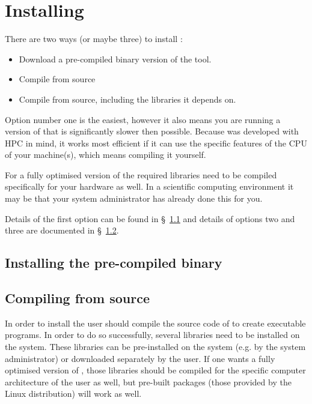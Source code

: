 \chapter{Installing \oanomm}

There are two ways (or maybe three) to install \oanomm:
\begin{itemize}
\item Download a pre-compiled binary version of the tool.
\item Compile \oanomm from source
\item Compile \oanomm from source, including the libraries it depends
  on.
\end{itemize}
Option number one is the easiest, however it also means you are
running a version of \oanomm that is significantly slower then
possible. Because \oanomm was developed with \ac{HPC} in mind, it
works most efficient if it can use the specific features of the
\ac{CPU} of your machine(s), which means compiling it yourself.

For a fully optimised version of \oanomm the required libraries need
to be compiled specifically for your hardware as well. In a scientific
computing environment it may be that your system administrator has
already done this for you.

Details of the first option can be found in \S~\ref{sec:binaryinstall}
and details of options two and three are documented in
\S~\ref{sec:compile}.

\section{Installing the pre-compiled binary}
\label{sec:binaryinstall}


\section{Compiling \oanomm from source}
\label{sec:compile}
In order to install \oanomm the user should compile the source code of
\oanomm to create executable programs. In order to do so successfully,
several libraries need to be installed on the system.  These libraries
can be pre-installed on the system (e.g. by the system administrator)
or downloaded separately by the user. If one wants a fully optimised
version of \oanomm, those libraries should be compiled for the
specific computer architecture of the user as well, but pre-built
packages (\eg those provided by the Linux distribution) will work as
well.

